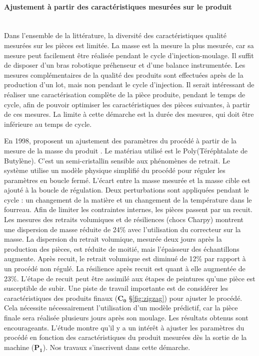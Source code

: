 \paragraph{Ajustement à partir des caractéristiques mesurées sur le produit}\mbox{} \\
Dans l'ensemble de la littérature, la diversité des caractéristiques qualité mesurées sur les pièces est limitée.
La masse est la mesure la plus mesurée, car sa mesure peut facilement être réalisée pendant le cycle d'injection-moulage.
Il suffit de disposer d'un bras robotique préhenseur et d'une balance instrumentée.
Les mesures complémentaires de la qualité des produits sont effectuées après de la production d'un lot, mais non pendant le cycle d'injection.
Il serait intéressant de réaliser une caractérisation complète de la pièce produite, pendant le temps de cycle, afin de pouvoir optimiser les caractéristiques des pièces suivantes, à partir de ces mesures.
La limite à cette démarche est la durée des mesures, qui doit être inférieure au temps de cycle.

En 1998, \citeauthor{fournier_conduite_2006} proposent un ajustement des paramètres du procédé à partir de la mesure de la masse du produit \cite{fournier_conduite_2006}.
Le matériau utilisé est le Poly(Téréphtalate de Butylène).
C'est un semi-cristallin sensible aux phénomènes de retrait.
Le système utilise un modèle physique simplifié du procédé pour réguler les paramètres en boucle fermé.
L'écart entre la masse mesurée et la masse cible est ajouté à la boucle de régulation.
Deux perturbations sont appliquées pendant le cycle : un changement de la matière et un changement de la température dans le fourreau.
Afin de limiter les contraintes internes, les pièces passent par un recuit.
Les mesures des retraits volumiques et de résiliences (chocs Charpy) montrent une dispersion de masse réduite de 24\% avec l'utilisation du correcteur sur la masse.
La dispersion du retrait volumique, mesurée deux jours après la production des pièces, est réduite de moitié, mais l'épaisseur des échantillons augmente.
Après recuit, le retrait volumique est diminué de 12\% par rapport à un procédé non régulé.
La résilience après recuit est quant à elle augmentée de 23\%.
L'étape de recuit peut être assimilé aux étapes de peintures qu'une pièce est susceptible de subir.
Une piste de travail importante est de considérer les caractéristiques des produits finaux ($\boldsymbol{C_0}$ §\ref{fig:zigzag}) pour ajuster le procédé.
Cela nécessite nécessairement l'utilisation d'un modèle prédictif, car la pièce finale sera réalisée plusieurs jours après son moulage.
Les résultats obtenus sont encourageants.
L'étude montre qu'il y a un intérêt à ajuster les paramètres du procédé en fonction des caractéristiques du produit mesurées dès la sortie de la machine ($\boldsymbol{P_1}$).
Nos travaux s'inscrivent dans cette démarche.

